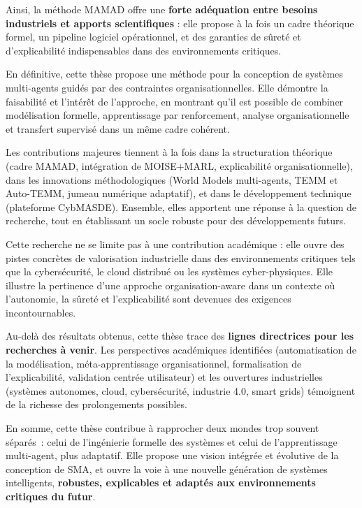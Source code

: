 \medskip
\noindent
Ainsi, la méthode MAMAD offre une \textbf{forte adéquation entre besoins industriels et apports scientifiques} :
elle propose à la fois un cadre théorique formel, un pipeline logiciel opérationnel, et des garanties de sûreté et d’explicabilité indispensables dans des environnements critiques.

\bigskip
\noindent
En définitive, cette thèse propose une méthode pour la conception de systèmes multi-agents guidés par des contraintes organisationnelles.
Elle démontre la faisabilité et l’intérêt de l’approche, en montrant qu’il est possible de combiner modélisation formelle, apprentissage par renforcement, analyse organisationnelle et transfert supervisé dans un même cadre cohérent.

\medskip
\noindent
Les contributions majeures tiennent à la fois dans la structuration théorique (cadre MAMAD, intégration de MOISE+MARL, explicabilité organisationnelle), dans les innovations méthodologiques (World Models multi-agents, TEMM et Auto-TEMM, jumeau numérique adaptatif), et dans le développement technique (plateforme CybMASDE).
Ensemble, elles apportent une réponse à la question de recherche, tout en établissant un socle robuste pour des développements futurs.

\medskip
\noindent
Cette recherche ne se limite pas à une contribution académique : elle ouvre des pistes concrètes de valorisation industrielle dans des environnements critiques tels que la cybersécurité, le cloud distribué ou les systèmes cyber-physiques.
Elle illustre la pertinence d’une approche organisation-aware dans un contexte où l’autonomie, la sûreté et l’explicabilité sont devenues des exigences incontournables.

\medskip
\noindent
Au-delà des résultats obtenus, cette thèse trace des \textbf{lignes directrices pour les recherches à venir}.
Les perspectives académiques identifiées (automatisation de la modélisation, méta-apprentissage organisationnel, formalisation de l’explicabilité, validation centrée utilisateur) et les ouvertures industrielles (systèmes autonomes, cloud, cybersécurité, industrie 4.0, smart grids) témoignent de la richesse des prolongements possibles.

\medskip
\noindent
En somme, cette thèse contribue à rapprocher deux mondes trop souvent séparés~: celui de l’ingénierie formelle des systèmes et celui de l’apprentissage multi-agent, plus adaptatif.
Elle propose une vision intégrée et évolutive de la conception de SMA, et ouvre la voie à une nouvelle génération de systèmes intelligents, \textbf{robustes, explicables et adaptés aux environnements critiques du futur}.



\clearpage
\thispagestyle{empty}
\null
\newpage
